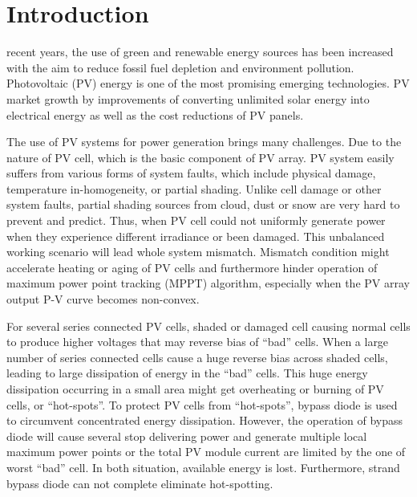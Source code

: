 \documentclass[journal]{IEEEtran}
\begin{document}
\IEEEpeerreviewmaketitle



\section{Introduction}
 recent years, the use of green and renewable energy sources has been increased with the aim to reduce fossil fuel depletion and environment pollution.
Photovoltaic (PV) energy is one of the most promising emerging technologies.
PV market growth by improvements of converting unlimited solar energy into electrical energy as well as the cost reductions of PV panels.

The use of PV systems for power generation brings many challenges.
Due to the nature of PV cell, which is the basic component of PV array.
PV system easily suffers from various forms of system faults, which include physical damage, temperature in-homogeneity, or partial shading.
Unlike cell damage or other system faults, partial shading sources from cloud, dust or snow are very hard to prevent and predict.
Thus, when PV cell could not uniformly generate power when they experience different irradiance or been damaged.
This unbalanced working scenario will lead whole system mismatch.
Mismatch condition might accelerate heating or aging of PV cells and furthermore hinder operation of maximum power point tracking (MPPT) algorithm, especially when the PV array output P-V curve becomes non-convex\cite{islam2018performance}.

For several series connected PV cells, shaded or damaged cell causing normal cells to produce higher voltages that may reverse bias of ``bad'' cells.
When a large number of series connected cells cause a huge reverse bias across shaded cells, leading to large dissipation of energy in the ``bad'' cells.
This huge energy dissipation occurring in a small area might get overheating or burning of PV cells, or ``hot-spots''.
To protect PV cells from ``hot-spots'', bypass diode is used to circumvent concentrated energy dissipation.
However, the operation of bypass diode will cause several stop delivering power and generate multiple local maximum power points\cite{Orozco-Gutierrez2016} or the total PV module current are limited by the one of worst ``bad'' cell.
In both situation, available energy is lost.
Furthermore, strand bypass diode can not complete eliminate hot-spotting\cite{kim2015reexamination}.
\end{document}
